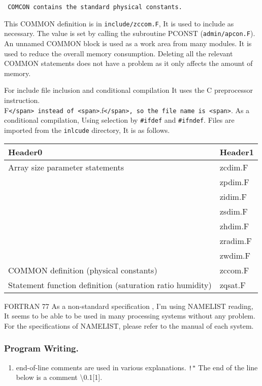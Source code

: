 \begin{verbatim}
 COMCON contains the standard physical constants.
\end{verbatim}

This COMMON definition is in {\texttt{include/zccom.F}}, It is used to
include as necessary. The value is set by calling the subroutine PCONST
({\texttt{admin/apcon.F}}). An unnamed COMMON block is used as a work
area from many modules. It is used to reduce the overall memory
consumption. Deleting all the relevant COMMON statements does not have a
problem as it only affects the amount of memory.

For include file inclusion and conditional compilation It uses the C
preprocessor instruction.
F\texttt{\textless{}/span\textgreater{}\ instead\ of\ \textless{}span\textgreater{}}.f\texttt{\textless{}/span\textgreater{},\ so\ the\ file\ name\ is\ \textless{}span\textgreater{}}.
As a conditional compilation, Using selection by {\texttt{\#ifdef}} and
{\texttt{\#ifndef}}. Files are imported from the {\texttt{inlcude}}
directory, It is as follows.

\begin{longtable}[]{@{}ll@{}}
\toprule
Header0 & Header1\tabularnewline
\midrule
\endhead
Array size parameter statements & zcdim.F\tabularnewline
& zpdim.F\tabularnewline
& zidim.F\tabularnewline
& zsdim.F\tabularnewline
& zhdim.F\tabularnewline
& zradim.F\tabularnewline
& zwdim.F\tabularnewline
COMMON definition (physical constants) & zccom.F\tabularnewline
Statement function definition (saturation ratio humidity) &
zqsat.F\tabularnewline
\bottomrule
\end{longtable}

FORTRAN 77 As a non-standard specification , I'm using NAMELIST reading,
It seems to be able to be used in many processing systems without any
problem. For the specifications of NAMELIST, please refer to the manual
of each system.

\hypertarget{program-writing.}{%
\subsubsection{Program Writing.}\label{program-writing.}}

\begin{enumerate}
\def\labelenumi{\arabic{enumi}.}
\tightlist
\item
  end-of-line comments are used in various explanations. \texttt{!"} The
  end of the line below is a comment \textbackslash0.1{[}1{]}.
\end{enumerate}

